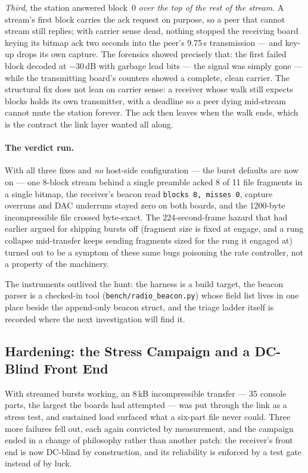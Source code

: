 \emph{Third}, the station answered block~0 \emph{over the top of the
rest of the stream}. A stream's first block carries the ack request on
purpose, so a peer that cannot stream still replies; with carrier
sense dead, nothing stopped the receiving board keying its bitmap ack
two seconds into the peer's 9.75\,s transmission --- and key-up drops
its own capture. The forensics showed precisely that: the first failed
block decoded at $-30$\,dB with garbage lead bits --- the signal was
simply gone --- while the transmitting board's counters showed a
complete, clean carrier. The structural fix does not lean on carrier
sense: a receiver whose walk still expects blocks holds its own
transmitter, with a deadline so a peer dying mid-stream cannot mute the
station forever. The ack then leaves when the walk ends, which is the
contract the link layer wanted all along.

\paragraph{The verdict run.} With all three fixes and \emph{no}
host-side configuration --- the burst defaults are now on --- one
8-block stream behind a single preamble acked 8 of 11 file fragments
in a single bitmap, the receiver's beacon read
\texttt{blocks 8, misses 0}, capture overruns and DAC underruns stayed
zero on both boards, and the 1200-byte incompressible file crossed
byte-exact. The 224-second-frame hazard that had earlier argued for
shipping bursts off (fragment size is fixed at engage, and a rung
collapse mid-transfer keeps sending fragments sized for the rung it
engaged at) turned out to be a symptom of these same bugs poisoning
the rate controller, not a property of the machinery.

The instruments outlived the hunt: the harness is a build target, the
beacon parser is a checked-in tool
(\texttt{bench/radio\_beacon.py}) whose field list lives in one place
beside the append-only beacon struct, and the triage ladder itself is
recorded where the next investigation will find it.

\subsection{Hardening: the Stress Campaign and a DC-Blind Front End}
\label{sec:cport_harden}

With streamed bursts working, an 8\,kB incompressible transfer --- 35
console parts, the largest the boards had attempted --- was put through
the link as a stress test, and sustained load surfaced what a
six-part file never could. Three more failures fell out, each again
convicted by measurement, and the campaign ended in a change of
philosophy rather than another patch: the receiver's front end is now
DC-blind by construction, and its reliability is enforced by a test
gate instead of by luck.

